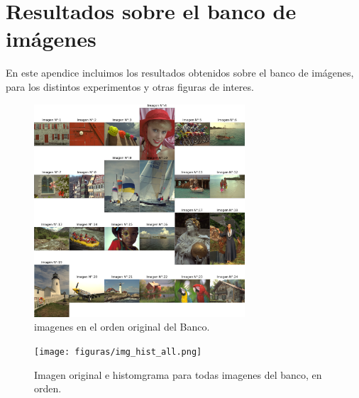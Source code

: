 \chapter{Resultados sobre el banco de im\'agenes}\label{appA}

En este apendice incluimos los resultados obtenidos sobre el banco de im\'agenes, para los distintos experimentos y otras figuras de interes. 


\begin{figure}[H]
    \centering
    \includegraphics[width=0.7\textwidth]{figuras/all_images_in_order.png}
    \caption{imagenes en el orden original del Banco.}
\end{figure}


\begin{figure}
    \centering
    \texttt{[image: figuras/img\_hist\_all.png]}
    \caption{Imagen original e histomgrama para todas imagenes del banco, en orden.}
\end{figure}

